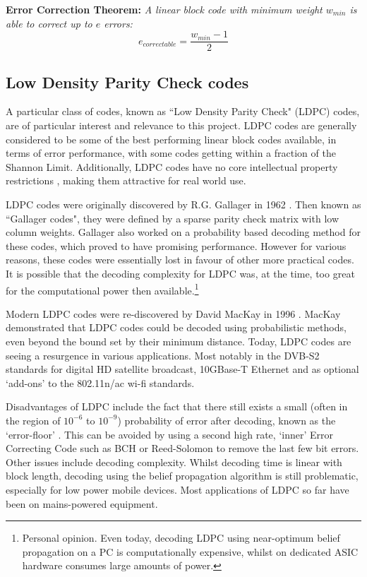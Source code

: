 \documentclass[11pt]{article}
\numberwithin{equation}{subsection}
\begin{document}
\noindent
\textbf{Error Correction Theorem:}
\textit{A linear block code with minimum weight $w_{min}$ is able to correct up to $e$ errors:}
\begin{equation}
e_{correctable} = \dfrac{w_{min} - 1}{2}
\end{equation}

\subsection{Low Density Parity Check codes}
A particular class of codes, known as ``Low Density Parity Check" (LDPC) codes, are of particular interest and relevance to this project. LDPC codes are generally considered to be some of the best performing linear block codes available, in terms of error performance, with some codes getting within a fraction of the Shannon Limit. Additionally, LDPC codes have no core intellectual property restrictions \cite[p.90]{coon15}, making them attractive for real world use.

LDPC codes were originally discovered by R.G. Gallager in 1962 \cite{gallager1962low}. Then known as ``Gallager codes", they were defined by a sparse parity check matrix with low column weights. Gallager also worked on a probability based decoding method for these codes, which proved to have promising performance. However for various reasons, these codes were essentially lost in favour of other more practical codes. It is possible that the decoding complexity for LDPC was, at the time, too great for the computational power then available.\footnote{Personal opinion. Even today, decoding LDPC using near-optimum belief propagation on a PC is computationally expensive, whilst on dedicated ASIC hardware consumes large amounts of power.}

Modern LDPC codes were re-discovered by David MacKay in 1996 \cite{mncisit}. MacKay demonstrated that LDPC codes could be decoded using probabilistic methods, even beyond the bound set by their minimum distance. Today, LDPC codes are seeing a resurgence in various applications. Most notably in the DVB-S2 standards for digital HD satellite broadcast, 10GBase-T Ethernet and as optional `add-ons' to the 802.11n/ac wi-fi standards.

Disadvantages of LDPC include the fact that there still exists a small (often in the region of $10^{-6}$ to $10^{-9}$) probability of error after decoding, known as the `error-floor' \cite{richardson2003error}. This can be avoided by using a second high rate, `inner' Error Correcting Code such as BCH or Reed-Solomon to remove the last few bit errors. Other issues include decoding complexity. Whilst decoding time is linear with block length, decoding using the belief propagation algorithm is still problematic, especially for low power mobile devices. Most applications of LDPC so far have been on mains-powered equipment.
\end{document}
